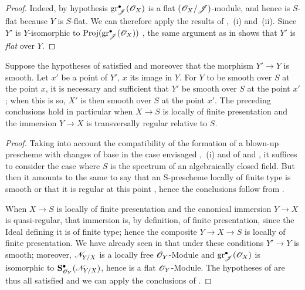 \begin{proof}
Indeed, by hypothesis $\operatorname{gr}_{\mathscr{J}}^\bullet(\mathscr{O}_X)$ is a flat $(\mathscr{O}_X/\mathscr{J})$-module, and hence is $S$-flat because $Y$ is $S$-flat.
We can therefore apply the results of ,~(i) and~(ii).
Since $Y'$ is $Y$-isomorphic to $\operatorname{Proj}(\operatorname{gr}_{\mathscr{J}}^\bullet(\mathscr{O}_X))$ , the same argument as in  shows that $Y'$ is \emph{flat} over $Y$.
\end{proof}

\begin{proposition}[19.4.8]
\label{IV.19.4.8}
Suppose the hypotheses of  satisfied and moreover that the morphism $Y'\to Y$ is smooth.
Let $x'$ be a point of $Y'$, $x$ its image in $Y$.
For $Y$ to be smooth over $S$ at the point $x$, it is necessary and sufficient that $Y'$ be smooth over $S$ at the point $x'$; when this is so, $X'$ is then smooth over $S$ at the point $x'$.
The preceding conclusions hold in particular when $X\to S$ is locally of finite presentation and the immersion $Y\to X$ is transversally regular relative to $S$.
\end{proposition}

\begin{proof}
Taking into account the compatibility of the formation of a blown-up prescheme with changes of base in the case envisaged ,~(i) and of  and ,
it suffices to consider the case where $S$ is the spectrum of an algebraically closed field.
But then it amounts to the same to say that an S-prescheme locally of finite type is smooth or that it is regular at this point , hence the conclusions follow from .

When $X\to S$ is locally of finite presentation and the canonical immersion $Y\to X$ is quasi-regular, that immersion is, by definition, of finite presentation, since the Ideal defining it is of finite type; hence the composite $Y\to X\to S$ is locally of finite presentation.
We have already seen in  that under these conditions $Y'\to Y$ is smooth; moreover, $\mathscr{N}_{Y/X}$ is a locally free $\mathscr{O}_Y$-Module and $\operatorname{gr}_{\mathscr{J}}^\bullet(\mathscr{O}_X)$ is isomorphic to $\mathbf{S}^\bullet_{\mathscr{O}_Y}(\mathscr{N}_{Y/X})$, hence is a flat $\mathscr{O}_Y$-Module.
The hypotheses of  are thus all satisfied and we can apply the conclusions of .
\end{proof}

